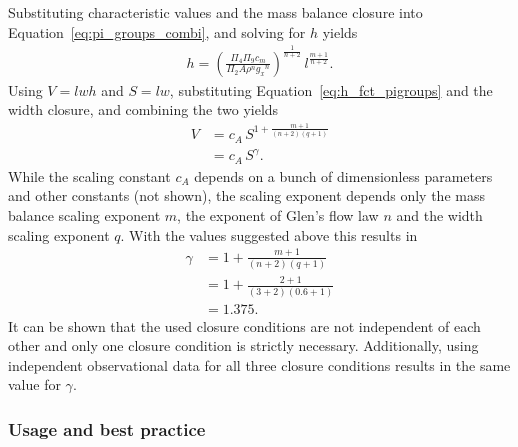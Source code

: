             Substituting characteristic values and the mass balance closure into Equation~\ref{eq:pi_groups_combi}, and solving for $h$ yields
            \begin{align}\label{eq:h_fct_pigroups}
                h = \left(\frac{\Pi_4 \Pi_9 c_m}{\Pi_2 A\rho^n {g_x}^n}\right)^\frac{1}{n+2}\, l^\frac{m+1}{n+2}.
            \end{align}
            Using $V = lwh$ and $S=lw$, substituting Equation~\ref{eq:h_fct_pigroups} and the width closure, and combining the two yields
            \begin{align}\label{eq:vas_exponent}
                V &= c_A\, S^{1+\frac{m+1}{(n+2)(q+1)}}\\
                  &= c_A\, S^\gamma.
            \end{align}
            While the scaling constant $c_A$ depends on a bunch of dimensionless parameters and other constants (not shown), the scaling exponent depends only the mass balance scaling exponent $m$, the exponent of Glen's flow law $n$ and the width scaling exponent $q$. With the values suggested above this results in
            \begin{align}
                \gamma &= 1 + \frac{m+1}{(n+2)(q+1)}\\
                       &= 1 + \frac{2+1}{(3+2)(0.6+1)}\\ 
                       &= 1.375.
            \end{align}
            It can be shown that the used closure conditions are not independent of each other and only one closure condition is strictly necessary. Additionally, using independent observational data for all three closure conditions results in the same value for $\gamma$.            
        

        \subsubsection{Usage and best practice} %
        \label{ssub:usage_and_best_practice}

